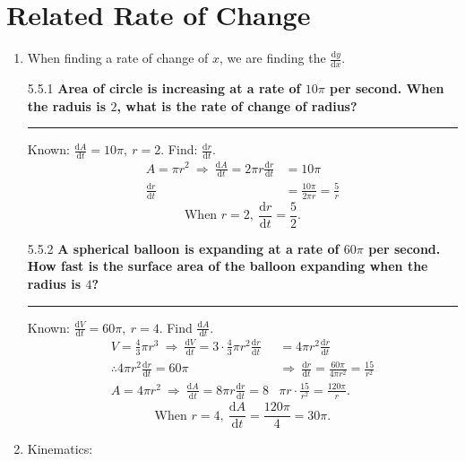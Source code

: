 \documentclass[12pt, a4paper]{article}
\begin{document}
\section{Related Rate of Change}
\begin{enumerate}
    \item When finding a rate of change of $x$, we are finding the $\frac{\mathrm{d}y}{\mathrm{d}x}$.
    \begin{example}{5.5.1}{}
        \textbf{Area of circle is increasing at a rate of $10\pi$ per second. When the raduis is $2$, what is the rate of change of radius? }\\
        \noindent\rule[0.1pt]{\textwidth}{1pt}
        Known: $\frac{\mathrm{d}A}{\mathrm{d}t}=10\pi,\ r=2$. Find: $\frac{\mathrm{d}r}{\mathrm{d}t}$.
        $$\begin{aligned}
            A=\pi r^2 \ \Rightarrow \ \frac{\mathrm{d}A}{\mathrm{d}t}=2\pi r\frac{\mathrm{d}r}{\mathrm{d}t}&=10\pi\\
            \frac{\mathrm{d}r}{\mathrm{d}t}&=\frac{10\pi}{2\pi r}=\frac{5}{r}
        \end{aligned}$$
        $$\text{When }r=2,\ \frac{\mathrm{d}r}{\mathrm{d}t}=\frac{5}{2}.$$
    \end{example}
    \begin{example}{5.5.2}{}
        \textbf{A spherical balloon is expanding at a rate of $60\pi$ per second. How fast is the surface area of the balloon expanding when the radius is $4$? }\\
        \noindent\rule[0.1pt]{\textwidth}{1pt}
        Known: $\frac{\mathrm{d}V}{\mathrm{d}t}=60\pi,\ r=4$. Find $\frac{\mathrm{d}A}{\mathrm{d}t}$.
        $$\begin{aligned}
            V=\frac{4}{3}\pi r^3\ \Rightarrow\ \frac{\mathrm{d}V}{\mathrm{d}t}=3\cdot\frac{4}{3}\pi r^2\frac{\mathrm{d}r}{\mathrm{d}t}&=4\pi r^2\frac{\mathrm{d}r}{\mathrm{d}t}\\
            \therefore 4\pi r^2\frac{\mathrm{d}r}{\mathrm{d}t}=60\pi\ &\Rightarrow\ \frac{\mathrm{d}r}{\mathrm{d}t}=\frac{60\pi}{4\pi r^2}=\frac{15}{r^2}\\
            A=4\pi r^2\ \Rightarrow\ \frac{\mathrm{d}A}{\mathrm{d}t}=8\pi r\frac{\mathrm{d}r}{\mathrm{d}t}=8&\pi r\cdot\frac{15}{r^2}=\frac{120\pi}{r}.
        \end{aligned}$$
        $$\text{When }r=4,\ \frac{\mathrm{d}A}{\mathrm{d}t}=\frac{120\pi}{4}=30\pi.$$
    \end{example}
    \item Kinematics: 

\end{enumerate}
\end{document}
